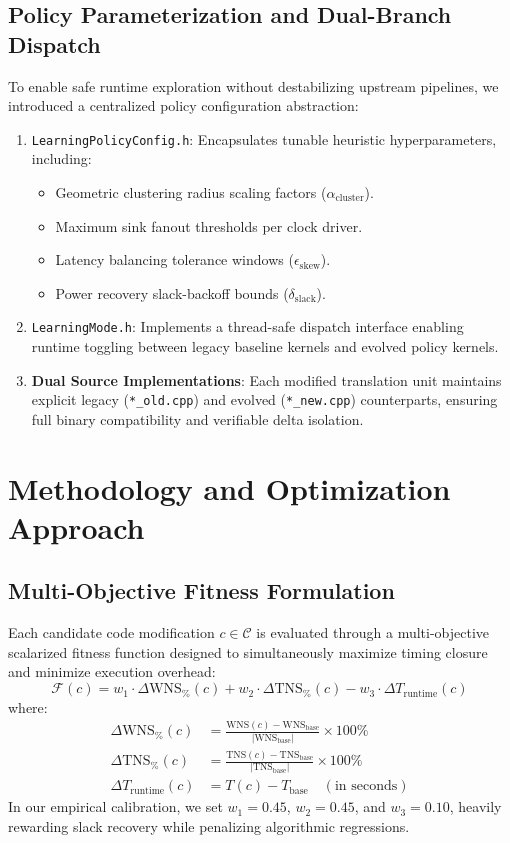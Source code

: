 \documentclass[10pt,twocolumn]{article}
\begin{document}
\subsection{Policy Parameterization and Dual-Branch Dispatch}
To enable safe runtime exploration without destabilizing upstream pipelines, we introduced a centralized policy configuration abstraction:
\begin{enumerate}
    \item \texttt{LearningPolicyConfig.h}: Encapsulates tunable heuristic hyperparameters, including:
    \begin{itemize}
        \item Geometric clustering radius scaling factors ($\alpha_{\text{cluster}}$).
        \item Maximum sink fanout thresholds per clock driver.
        \item Latency balancing tolerance windows ($\epsilon_{\text{skew}}$).
        \item Power recovery slack-backoff bounds ($\delta_{\text{slack}}$).
    \end{itemize}
    \item \texttt{LearningMode.h}: Implements a thread-safe dispatch interface enabling runtime toggling between legacy baseline kernels and evolved policy kernels.
    \item \textbf{Dual Source Implementations}: Each modified translation unit maintains explicit legacy (\texttt{*\_old.cpp}) and evolved (\texttt{*\_new.cpp}) counterparts, ensuring full binary compatibility and verifiable delta isolation.
\end{enumerate}

\section{Methodology and Optimization Approach}

\subsection{Multi-Objective Fitness Formulation}
Each candidate code modification $c \in \mathcal{C}$ is evaluated through a multi-objective scalarized fitness function designed to simultaneously maximize timing closure and minimize execution overhead:
\begin{equation}
    \mathcal{F}(c) = w_1 \cdot \Delta\text{WNS}_{\%}(c) + w_2 \cdot \Delta\text{TNS}_{\%}(c) - w_3 \cdot \Delta T_{\text{runtime}}(c)
\end{equation}
where:
\begin{align*}
    \Delta\text{WNS}_{\%}(c) &= \frac{\text{WNS}(c) - \text{WNS}_{\text{base}}}{|\text{WNS}_{\text{base}}|} \times 100\% \\
    \Delta\text{TNS}_{\%}(c) &= \frac{\text{TNS}(c) - \text{TNS}_{\text{base}}}{|\text{TNS}_{\text{base}}|} \times 100\% \\
    \Delta T_{\text{runtime}}(c) &= T(c) - T_{\text{base}} \quad (\text{in seconds})
\end{align*}
In our empirical calibration, we set $w_1 = 0.45$, $w_2 = 0.45$, and $w_3 = 0.10$, heavily rewarding slack recovery while penalizing algorithmic regressions.
\end{document}
